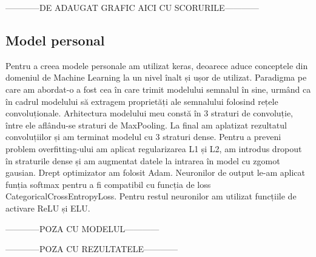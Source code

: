 ------------DE ADAUGAT GRAFIC AICI CU SCORURILE------------

\subsection{Model personal}
Pentru a creea modele personale am utilizat keras, deoarece aduce conceptele din domeniul de Machine Learning la un nivel înalt și ușor de utilizat. Paradigma pe care am abordat-o a fost cea în care trimit modelului semnalul în sine, urmând ca în cadrul modelului să extragem proprietăți ale semnalului folosind rețele convoluționale. Arhitectura modelului meu constă în 3 straturi de convoluție, între ele aflându-se straturi de MaxPooling. La final am aplatizat rezultatul convoluțiilor și am terminat modelul cu 3 straturi dense. Pentru a preveni problem overfitting-ului am aplicat regularizarea L1 și L2, am introdus dropout în straturile dense și am augmentat datele la intrarea în model cu zgomot gausian. Drept optimizator am folosit Adam. Neuronilor de output le-am aplicat funția softmax pentru a fi compatibil cu funcția de loss CategoricalCrossEntropyLoss. Pentru restul neuronilor am utilizat funcțiile de activare ReLU și ELU.

------------POZA CU MODELUL------------

------------POZA CU REZULTATELE------------
